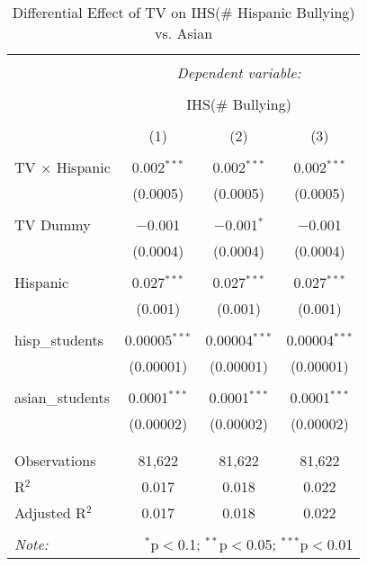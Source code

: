 
\begin{table}[!htbp] \centering 
  \caption{Differential Effect of TV on IHS(\# Hispanic Bullying) vs. Asian} 
  \label{} 
\begin{tabular}{@{\extracolsep{-2pt}}lccc} 
\\[-1.8ex]\hline 
\hline \\[-1.8ex] 
 & \multicolumn{3}{c}{\textit{Dependent variable:}} \\ 
\cline{2-4} 
\\[-1.8ex] & \multicolumn{3}{c}{IHS(\# Bullying)} \\ 
\\[-1.8ex] & (1) & (2) & (3)\\ 
\hline \\[-1.8ex] 
 TV $\times$ Hispanic & 0.002$^{***}$ & 0.002$^{***}$ & 0.002$^{***}$ \\ 
  & (0.0005) & (0.0005) & (0.0005) \\ 
  & & & \\ 
 TV Dummy & $-$0.001 & $-$0.001$^{*}$ & $-$0.001 \\ 
  & (0.0004) & (0.0004) & (0.0004) \\ 
  & & & \\ 
 Hispanic & 0.027$^{***}$ & 0.027$^{***}$ & 0.027$^{***}$ \\ 
  & (0.001) & (0.001) & (0.001) \\ 
  & & & \\ 
 hisp\_students & 0.00005$^{***}$ & 0.00004$^{***}$ & 0.00004$^{***}$ \\ 
  & (0.00001) & (0.00001) & (0.00001) \\ 
  & & & \\ 
 asian\_students & 0.0001$^{***}$ & 0.0001$^{***}$ & 0.0001$^{***}$ \\ 
  & (0.00002) & (0.00002) & (0.00002) \\ 
  & & & \\ 
\hline \\[-1.8ex] 
Observations & 81,622 & 81,622 & 81,622 \\ 
R$^{2}$ & 0.017 & 0.018 & 0.022 \\ 
Adjusted R$^{2}$ & 0.017 & 0.018 & 0.022 \\ 
\hline 
\hline \\[-1.8ex] 
\textit{Note:}  & \multicolumn{3}{r}{$^{*}$p$<$0.1; $^{**}$p$<$0.05; $^{***}$p$<$0.01} \\ 
\end{tabular} 
\end{table} 
